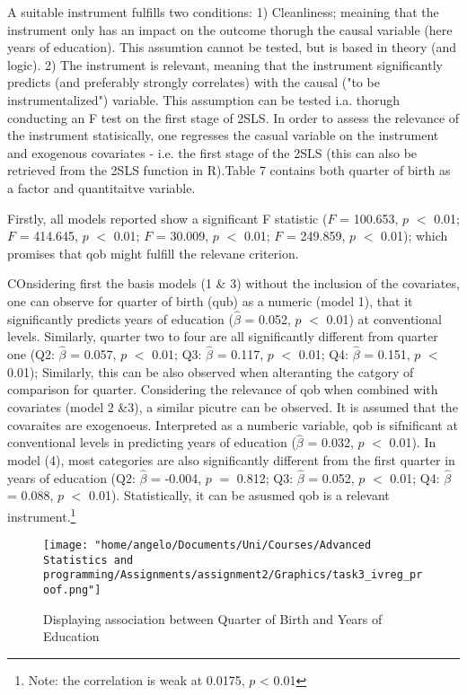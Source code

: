 \documentclass[a4paper]{article}
\begin{document}
A suitable instrument fulfills two conditions: 1) Cleanliness; meaining that the instrument only has an impact on the outcome thorugh the causal variable (here years of education). This assumtion cannot be tested, but is based in theory (and logic).
2) The instrument is relevant, meaning that the instrument significantly predicts (and preferably strongly correlates) with the causal ("to be instrumentalized") variable. This assumption can be tested i.a. thorugh conducting an F test on the first stage of 2SLS. 
In order to assess the relevance of the instrument statisically, one regresses the casual variable on the instrument and exogenous covariates - i.e. the first stage of the 2SLS (this can also be retrieved from the 2SLS function in R).Table 7 contains both quarter of birth as a factor and quantitaitve variable. 

Firstly, all models reported show a significant F statistic ($F$ = 100.653, $p$ $<$ 0.01; $F$ = 414.645, $p$ $<$ 0.01; $F$ = 30.009, $p$ $<$ 0.01; $F$ = 249.859, $p$ $<$ 0.01); which promises that qob might fulfill the relevane criterion.

COnsidering first the basis models (1 \& 3) without the inclusion of the covariates, one can observe for quarter of birth (qub) as a numeric (model 1), that it significantly predicts years of education ($\hat{\beta}$ = 0.052, $p$ $<$ 0.01) at conventional levels. Similarly, quarter two to four are all significantly different from quarter one (Q2: $\hat{\beta}$ = 0.057, $p$ $<$ 0.01; Q3: $\hat{\beta}$ = 0.117, $p$ $<$ 0.01; Q4: $\hat{\beta}$ = 0.151, $p$ $<$ 0.01); Similarly, this can be also  observed when alteranting the catgory of comparison for quarter. 
Considering the relevance of qob when combined with covariates (model 2 \&3), a similar picutre can be observed. It is assumed that the covaraites are exogenoeus. Interpreted as a numberic variable, qob is sifnificant at conventional levels in predicting years of education ($\hat{\beta}$ = 0.032, $p$ $<$ 0.01). In model (4), most categories are also significantly different from the first quarter in years of education (Q2: $\hat{\beta}$ = -0.004, $p$ $=$ 0.812; Q3: $\hat{\beta}$ = 0.052, $p$ $<$ 0.01; Q4: $\hat{\beta}$ = 0.088, $p$ $<$ 0.01). Statistically, it can be asusmed qob is a relevant instrument.\footnote{Note: the correlation is weak at 0.0175, $p$ < 0.01}

\begin{figure}[htp]
		\centering
         \texttt{[image: "home/angelo/Documents/Uni/Courses/Advanced Statistics and programming/Assignments/assignment2/Graphics/task3\_ivreg\_proof.png"]}
         \small
         \caption{Displaying association between Quarter of Birth and Years of Education}
\end{figure}
\end{document}
